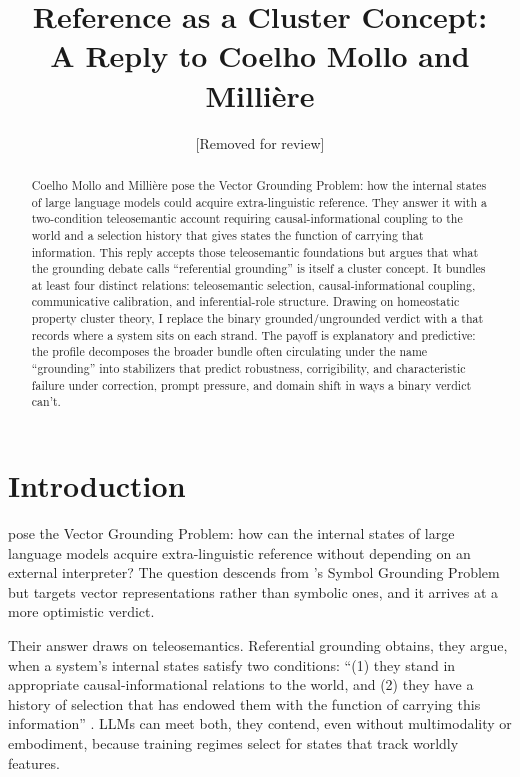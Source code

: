 \documentclass[12pt]{article}
\title{Reference as a Cluster Concept:\\A Reply to Coelho Mollo and Milli\`ere}
\author{[Removed for review]}
\date{}
\begin{document}
\maketitle

\begin{abstract}
Coelho Mollo and Milli\`ere pose the Vector Grounding Problem: how the internal states of large language models could acquire extra-linguistic reference. They answer it with a two-condition teleosemantic account requiring causal-informational coupling to the world and a selection history that gives states the function of carrying that information. This reply accepts those teleosemantic foundations but argues that what the grounding debate calls \enquote{referential grounding} is itself a cluster concept. It bundles at least four distinct relations: teleosemantic selection, causal-informational coupling, communicative calibration, and inferential-role structure. Drawing on homeostatic property cluster theory, I replace the binary grounded/ungrounded verdict with a  that records where a system sits on each strand. The payoff is explanatory and predictive: the profile decomposes the broader bundle often circulating under the name \enquote{grounding} into stabilizers that predict robustness, corrigibility, and characteristic failure under correction, prompt pressure, and domain shift in ways a binary verdict can't.
\end{abstract}

\section{Introduction}
\label{sec:intro}

\textcite{coelho_mollo_milliere_2026_vector_grounding_problem} pose the Vector Grounding Problem: how can the internal states of large language models acquire extra-linguistic reference without depending on an external interpreter? The question descends from \textcite{harnad_1990_symbol_grounding_problem}'s Symbol Grounding Problem but targets vector representations rather than symbolic ones, and it arrives at a more optimistic verdict.

Their answer draws on teleosemantics. Referential grounding obtains, they argue, when a system's internal states satisfy two conditions: \enquote{(1) they stand in appropriate causal-informational relations to the world, and (2) they have a history of selection that has endowed them with the function of carrying this information} \citep[1]{coelho_mollo_milliere_2026_vector_grounding_problem}. LLMs can meet both, they contend, even without multimodality or embodiment, because training regimes select for states that track worldly features.
\end{document}
